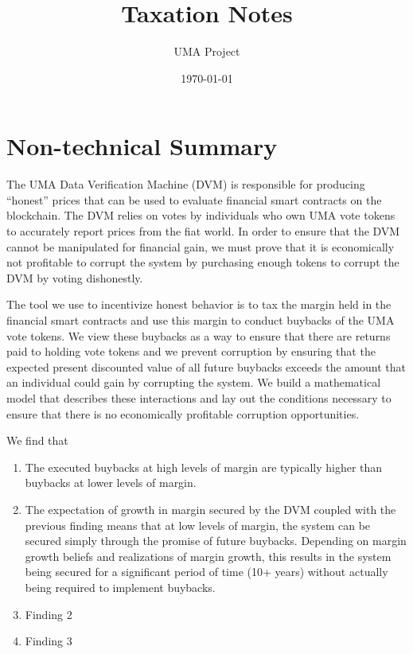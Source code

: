 \documentclass[12pt]{article}
\title{Taxation Notes}
\author{UMA Project}
\date{\today}
\begin{document}
\maketitle

\clearpage
\newpage


\section{Non-technical Summary}

  The UMA Data Verification Machine (DVM) is responsible for producing ``honest'' prices that can be
  used to evaluate financial smart contracts on the blockchain. The DVM relies on votes by
  individuals who own UMA vote tokens to accurately report prices from the fiat world. In order to
  ensure that the DVM cannot be manipulated for financial gain, we must prove that it is
  economically not profitable to corrupt the system by purchasing enough tokens to corrupt the DVM
  by voting dishonestly.

  The tool we use to incentivize honest behavior is to tax the margin held in the financial smart
  contracts and use this margin to conduct buybacks of the UMA vote tokens. We view these buybacks
  as a way to ensure that there are returns paid to holding vote tokens and we prevent corruption
  by ensuring that the expected present discounted value of all future buybacks exceeds the amount
  that an individual could gain by corrupting the system. We build a mathematical model that
  describes these interactions and lay out the conditions necessary to ensure that there is no
  economically profitable corruption opportunities.

  We find that

  \begin{enumerate}
    \item The executed buybacks at high levels of margin are typically higher than buybacks at lower
          levels of margin.
    \item The expectation of growth in margin secured by the DVM coupled with the previous finding
          means that at low levels of margin, the system can be secured simply through the promise
          of future buybacks. Depending on margin growth beliefs and realizations of margin growth,
          this results in the system being secured for a significant period of time (10+ years)
          without actually being required to implement buybacks.
    \item Finding 2
    \item Finding 3
  \end{enumerate}
\end{document}
